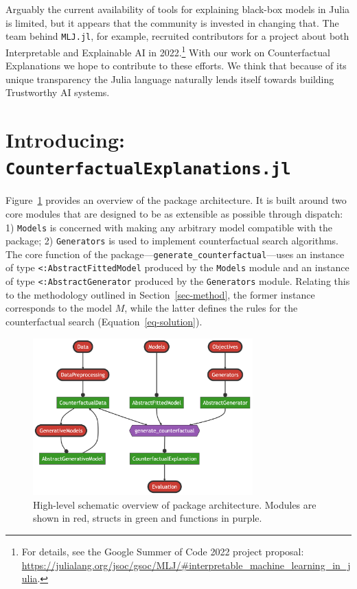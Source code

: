 \documentclass{juliacon}
\begin{document}
Arguably the current availability of tools for explaining black-box
models in Julia is limited, but it appears that the community is
invested in changing that. The team behind \texttt{MLJ.jl}, for example,
recruited contributors for a project about both Interpretable and
Explainable AI in 2022.\footnote{For details, see the Google Summer of
  Code 2022 project proposal:
  \url{https://julialang.org/jsoc/gsoc/MLJ/\#interpretable_machine_learning_in_julia}.}
With our work on Counterfactual Explanations we hope to contribute to
these efforts. We think that because of its unique transparency the
Julia language naturally lends itself towards building Trustworthy AI
systems.

\hypertarget{sec-arch}{%
\section{\texorpdfstring{Introducing:
\texttt{CounterfactualExplanations.jl}}{Introducing: CounterfactualExplanations.jl}}\label{sec-arch}}

Figure~\ref{fig-arch} provides an overview of the package architecture.
It is built around two core modules that are designed to be as
extensible as possible through dispatch: 1) \texttt{Models} is concerned
with making any arbitrary model compatible with the package; 2)
\texttt{Generators} is used to implement counterfactual search
algorithms. The core function of the
package---\texttt{generate\_counterfactual}---uses an instance of type
\texttt{\textless{}:AbstractFittedModel} produced by the \texttt{Models}
module and an instance of type \texttt{\textless{}:AbstractGenerator}
produced by the \texttt{Generators} module. Relating this to the
methodology outlined in Section~\ref{sec-method}, the former instance
corresponds to the model \(M\), while the latter defines the rules for
the counterfactual search (Equation~\ref{eq-solution}).

\begin{figure}

{\centering \includegraphics[width=3.33333in,height=2.38095in]{www/pkg_architecture.png}

}

\caption{\label{fig-arch}High-level schematic overview of package
architecture. Modules are shown in red, structs in green and functions
in purple.}

\end{figure}
\end{document}
